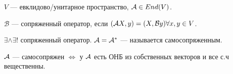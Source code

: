 \begin{definition}
    $V$ --- евклидово/унитарное пространство,  $\mathcal{A} \in End(V)$.

    $\mathcal{B}$ --- сопряженный оператор, если  $(\mathcal{A} X, y) = (X, \mathcal{B}y) \forall x, y \in V$.
\end{definition}
\begin{theorem}
    $\exists \land \exists!$ сопряженный оператор. $\mathcal{A} = \mathcal{A}^*$ --- называется самосопряженным.
\end{theorem}
\begin{theorem}
    $\mathcal{A}$ --- самосопряжен  $\iff$ у  $\mathcal{A}$ есть ОНБ из собственных векторов и все с.ч вещественны. 
\end{theorem}

